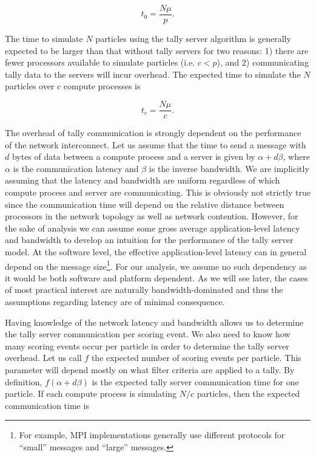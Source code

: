 \begin{equation}
  \label{eq:time-without}
  t_0 = \frac{N\mu}{p}.
\end{equation}

The time to simulate $N$ particles using the tally server algorithm is generally
expected to be larger than that without tally servers for two reasons: 1) there
are fewer processors available to simulate particles (i.e. $c < p$), and 2)
communicating tally data to the servers will incur overhead. The expected time
to simulate the $N$ particles over $c$ compute processes is

\begin{equation}
  \label{eq:compute-time}
  t_c = \frac{N\mu}{c}.
\end{equation}

\noindent The overhead of tally communication is strongly dependent on the
performance of the network interconnect. Let us assume that the time to send a
message with $d$ bytes of data between a compute process and a server is given
by $\alpha + d\beta$, where $\alpha$ is the communication latency and $\beta$ is
the inverse bandwidth. We are implicitly assuming that the latency and bandwidth
are uniform regardless of which compute process and server are
communicating. This is obviously not strictly true since the communication time
will depend on the relative distance between processors in the network topology
as well as network contention. However, for the sake of analysis we can assume
some gross average application-level latency and bandwidth to develop an
intuition for the performance of the tally server model. At the software level,
the effective application-level latency can in general depend on the message
size\footnote{For example, MPI implementations generally use different protocols
  for ``small'' messages and ``large'' messages.}. For our analysis, we assume
no such dependency as it would be both software and platform dependent. As we
will see later, the cases of most practical interest are naturally
bandwidth-dominated and thus the assumptions regarding latency are of minimal
consequence.

Having knowledge of the network latency and bandwidth allows us to determine the
tally server communication per scoring event.  We also need to know how many
scoring events occur per particle in order to determine the tally server
overhead. Let us call $f$ the expected number of scoring events per
particle. This parameter will depend mostly on what filter criteria are applied
to a tally. By definition, $f(\alpha + d\beta)$ is the expected tally server
communication time for one particle. If each compute process is simulating $N/c$
particles, then the expected communication time is

